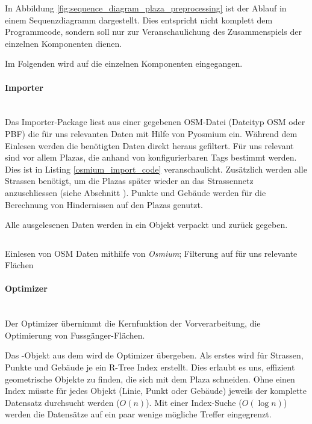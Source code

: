 In Abbildung \ref{fig:sequence_diagram_plaza_preprocessing} ist der Ablauf in einem Sequenzdiagramm dargestellt. Dies entspricht nicht komplett dem Programmcode, sondern soll nur zur Veranschaulichung des Zusammenspiels der einzelnen Komponenten dienen.

Im Folgenden wird auf die einzelnen Komponenten eingegangen.

\paragraph{Importer}\label{impl:Importer}~\\
Das Importer-Package liest aus einer gegebenen \ac{OSM}-Datei (Dateityp \ac{OSM} oder \ac{PBF}) die für uns relevanten Daten mit Hilfe von Pyosmium \cite{pyosmium} ein. Während dem Einlesen werden die benötigten Daten direkt heraus gefiltert. Für uns relevant sind vor allem Plazas, die anhand von konfigurierbaren Tags bestimmt werden. Dies ist in Listing \ref{osmium_import_code} veranschaulicht. Zusätzlich werden alle Strassen benötigt, um die Plazas später wieder an das Strassennetz anzuschliessen (siehe Abschnitt ). Punkte und Gebäude werden für die Berechnung von Hindernissen auf den Plazas genutzt.

Alle ausgelesenen Daten werden in ein  Objekt verpackt und zurück gegeben.

\begin{listing}[ht]
    \inputminted{python}{projectdoc/listing/osmium_handler.py}
    \caption[Einlesen OSM-Daten mit Osmium]{Einlesen von OSM Daten mithilfe von \emph{Osmium}; Filterung auf für uns relevante Flächen}
    \label{osmium_import_code}
\end{listing}

\paragraph{Optimizer}\label{impl:Optimizer}~\\
Der Optimizer übernimmt die Kernfunktion der Vorverarbeitung, die Optimierung von Fussgänger-Flächen.

Das -Objekt aus dem  wird de Optimizer übergeben. Als erstes wird für Strassen, Punkte und Gebäude je ein R-Tree \cite{rtree_Guttman} Index erstellt. Dies erlaubt es uns, effizient geometrische Objekte zu finden, die sich mit dem Plaza schneiden. Ohne einen Index müsste für jedes Objekt (Linie, Punkt oder Gebäude) jeweils der komplette Datensatz durchsucht werden ($O(n)$). Mit einer Index-Suche ($O(\log n)$) werden die Datensätze auf ein paar wenige mögliche Treffer eingegrenzt.

